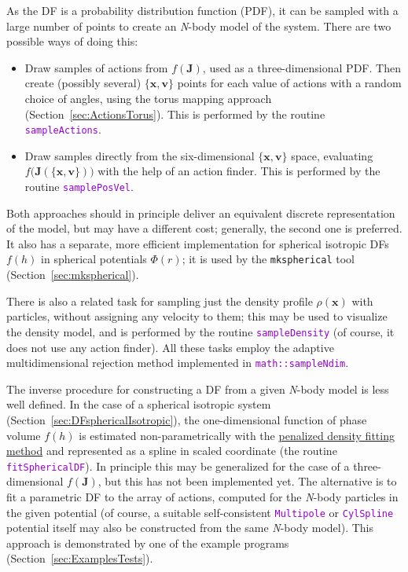 \documentclass[12pt]{article}
\newcommand{\Nbody}{\textsl{N}-body\xspace}
\newcommand{\ttt}[1]{\textcolor{darkviolet}{\texttt{#1}}}
\newcommand{\bv}{\boldsymbol{v}}
\newcommand{\bx}{\boldsymbol{x}}
\newcommand{\bJ}{\boldsymbol{J}}
\begin{document}
As the DF is a probability distribution function (PDF), it can be sampled with a large number of points to create an \Nbody model of the system. There are two possible ways of doing this:
\begin{itemize}  \setlength{\parskip}{2pt} \setlength{\itemsep}{2pt}
\item Draw samples of actions from $f(\bJ)$, used as a three-dimensional PDF. Then create (possibly several) $\{\bx,\bv\}$ points for each value of actions with a random choice of angles, using the torus mapping approach (Section~\ref{sec:ActionsTorus}). This is performed by the routine \ttt{sampleActions}.
\item Draw samples directly from the six-dimensional $\{\bx,\bv\}$ space, evaluating $f\big(\bJ(\{\bx,\bv\})\big)$ with the help of an action finder. This is performed by the routine \ttt{samplePosVel}.
\end{itemize}
Both approaches should in principle deliver an equivalent discrete representation of the model, but may have a different cost; generally, the second one is preferred. It also has a separate, more efficient implementation for spherical isotropic DFs $f(h)$ in spherical potentials $\Phi(r)$; it is used by the \texttt{mkspherical} tool (Section~\ref{sec:mkspherical}).

There is also a related task for sampling just the density profile $\rho(\bx)$ with particles, without assigning any velocity to them; this may be used to visualize the density model, and is performed by the routine \ttt{sampleDensity} (of course, it does not use any action finder). All these tasks employ the adaptive multidimensional rejection method implemented in \ttt{math::sampleNdim}.

The inverse procedure for constructing a DF from a given \Nbody model is less well defined. In the case of a spherical isotropic system (Section~\ref{sec:DFsphericalIsotropic}), the one-dimensional function of phase volume $f(h)$ is estimated non-parametrically with the \hyperref[sec:SplineFitting]{penalized density fitting method} and represented as a spline in scaled coordinate (the routine \ttt{fitSphericalDF}). In principle this may be generalized for the case of a three-dimensional $f(\bJ)$, but this has not been implemented yet. The alternative is to fit a parametric DF to the array of actions, computed for the \Nbody particles in the given potential (of course, a suitable self-consistent \ttt{Multipole} or \ttt{CylSpline} potential itself may also be constructed from the same \Nbody model). This approach is demonstrated by one of the example programs (Section~\ref{sec:ExamplesTests}).
\end{document}
